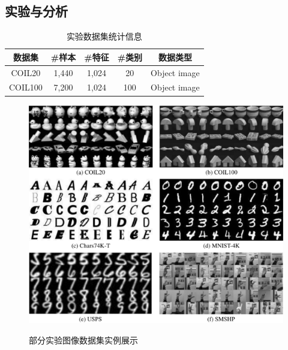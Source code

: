 \documentclass[engmaster]{thesis}
\begin{document}
\section{实验与分析}
\begin{table}[!t]
  \centering
  \caption{实验数据集统计信息}
  \begin{tabular}{*{5}{c}}
      \toprule
          数据集      & \#样本     & \#特征     & \#类别      & 数据类型 \\
      \midrule
          COIL20      & 1,440     & 1,024      & 20        & Object image \\
          COIL100     & 7,200     & 1,024      & 100       & Object image \\
      \bottomrule
  \end{tabular}
  \label{chapter_sgae_tab_datasets}
\end{table}
\begin{figure}[!t]
    \centering
    \includegraphics[width=16.5cm]{./figs/fig_data_visualization.pdf}\\
    \caption{部分实验图像数据集实例展示}
    \label{chapter_sgae_data_visualization}
\end{figure}



\thesisChapterConclusion
\chapter{~~~~~}
\end{document}
